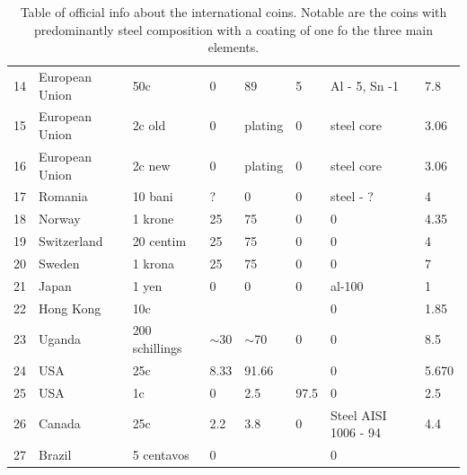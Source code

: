 \documentclass[11pt,a4paper,twoside,onecolumn]{article}
\begin{document}
\begin{table}[htbp]
\begin{tabular}{@{}llllllll@{}}
        14 & European Union & 50c            & 0        & 89       & 5      & Al - 5, Sn -1        & 7.8        \\
        15 & European Union & 2c old         & 0        & plating  & 0      & steel core           & 3.06       \\
        16 & European Union & 2c new         & 0        & plating  & 0      & steel core           & 3.06       \\
        17 & Romania        & 10 bani        & ?        & 0        & 0      & steel - ?            & 4          \\
        18 & Norway         & 1 krone        & 25       & 75       & 0      & 0                    & 4.35       \\
        19 & Switzerland    & 20 centim      & 25       & 75       & 0      & 0                    & 4          \\
        20 & Sweden         & 1 krona        & 25       & 75       & 0      & 0                    & 7          \\
        21 & Japan          & 1 yen          & 0        & 0        & 0      & al-100               & 1          \\
        22 & Hong Kong      & 10c            &          &          &        & 0                    & 1.85       \\
        23 & Uganda         & 200 schillings & $\sim$30 & $\sim$70 & 0      & 0                    & 8.5        \\
        24 & USA            & 25c            & 8.33     & 91.66    &        & 0                    & 5.670       \\
        25 & USA            & 1c             & 0        & 2.5      & 97.5   & 0                    & 2.5        \\
        26 & Canada         & 25c            & 2.2      & 3.8      & 0      & Steel AISI 1006 - 94 & 4.4        \\
        27 & Brazil         & 5 centavos     & 0        &          &        & 0                    &            \\ \bottomrule
    \end{tabular}
    \caption{Table of official info about the international coins. Notable are the coins with predominantly steel composition with a coating of one fo the three main elements.}
    \label{tab:coins-official}
\end{table}
\end{document}
